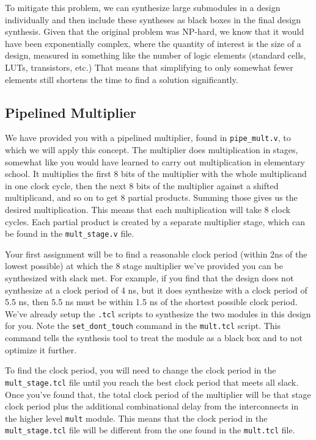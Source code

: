 \documentclass{article}
\begin{document}
To mitigate this problem, we can synthesize large submodules in a design
individually and then include these syntheses as black boxes in the final design
synthesis. Given that the original problem was NP-hard, we know that it would
have been exponentially complex, where the quantity of interest is the size of a
design, measured in something like the number of logic elements (standard cells,
LUTs, transistors, etc.) That means that simplifying to only somewhat fewer
elements still shortens the time to find a solution significantly.

\subsection{Pipelined Multiplier}
We have provided you with a pipelined multiplier, found in 
\texttt{pipe\_mult.v}, to which we will apply this concept. The multiplier does 
multiplication in stages, somewhat like you would have learned to carry out 
multiplication in elementary school. It multiplies the first 8 bits of the
multiplier with the whole multiplicand in one clock cycle, then the next 8 bits
of the multiplier against a shifted multiplicand, and so on to get 8 partial
products. Summing those gives us the desired multiplication. This means that 
each multiplication will take 8 clock cycles. Each partial product is created by
a separate multiplier stage, which can be found in the  \texttt{mult\_stage.v} 
file. 

Your first assignment will be to find a reasonable clock period (within
2\si{\nano\second} of the lowest possible) at which the 8 stage multiplier we've
provided you can be synthesized with slack met. For example, if you find that
the design does not synthesize at a clock period of 4 \si{\nano\second}, but it 
does synthesize with a clock period of 5.5 \si{\nano\second}, then 5.5 
\si{\nano\second} must be within 1.5 \si{\nano\second} of the shortest possible 
clock period. We've already setup the \texttt{.tcl} scripts to synthesize the 
two modules in this design for you. Note the  \texttt{set\_dont\_touch} command 
in the \texttt{mult.tcl} script. This command tells the synthesis tool to treat 
the module as a black box and to not optimize it further. 

To find the clock period, you will need to change the clock period in the
\texttt{mult\_stage.tcl} file until you reach the best clock period that meets
all slack. Once you've found that, the total clock period of the multiplier will
be that stage clock period plus the additional combinational delay from the
interconnects in the higher level \texttt{mult} module. This means that the
clock period in the \texttt{mult\_stage.tcl} file will be different from the one
found in the \texttt{mult.tcl} file.
\end{document}
